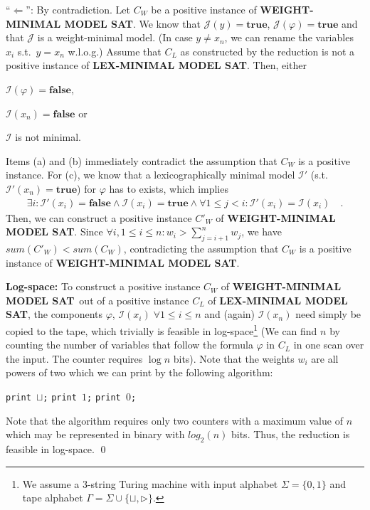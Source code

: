 \documentclass [11pt]{article}
\renewcommand{\phi}{\varphi}
\newcommand{\blank}{\sqcup}
\newcommand{\ssym}{\triangleright}
\newcommand{\True}{\mathbf{true}}
\newcommand{\False}{\mathbf{false}}
\newcommand{\MINWEIGHTSAT}{\textbf{WEIGHT-MINIMAL MODEL SAT}}
\newcommand{\MINLEXSAT}{\textbf{LEX-MINIMAL MODEL SAT}}
\newcommand{\mI}{\ensuremath{\mathcal{I}}}
\newcommand{\mJ}{\ensuremath{\mathcal{J}}}
\newcommand{\mIp}{\ensuremath{\mathcal{I}'}}
\newcommand{\fai}{\ensuremath{\forall i, 1 \leq i \leq n}}
\begin{document}
``$\Leftarrow$'': 
By contradiction.
Let $C_W$ be a positive instance of \MINWEIGHTSAT. We know that $\mJ(y) = \True$, $\mJ(\phi) = \True$ and that $\mJ$ is a weight-minimal model.
(In case $y \neq x_n$, we can rename the variables $x_i$ s.t.\ $y=x_n$ w.l.o.g.)
Assume that $C_L$ as constructed by the reduction is not a positive instance of \MINLEXSAT.
Then, either 
\begin{inparaenum}
\item $\mI(\phi) = \False $,
\item $\mI(x_n) = \False$ or
\item $\mI$ is not minimal.
\end{inparaenum}
Items (a) and (b) immediately contradict the assumption that $C_W$ is a positive instance.
For (c), we know that a lexicographically minimal model $\mIp$ (s.t.\ $\mIp(x_n) = \True$) for $\phi$ has to exists, which implies
\begin{align*}
 \exists i: \mIp(x_i) = \False \land  \mI(x_i) = \True \land \forall 1 \leq j < i: \mIp(x_i) = \mI(x_i) \quad .
\end{align*}
Then, we can construct a positive instance $C'_W$ of \MINWEIGHTSAT.
Since $\fai: w_i > \sum_{j=i+1}^{n} w_j $, we have $sum(C'_W) < sum(C_W)$, contradicting the assumption that $C_W$ is a positive instance of \MINWEIGHTSAT.

\medskip
\noindent
\textbf{Log-space:} To construct a positive instance $C_W$ of \MINWEIGHTSAT\ out of a positive instance $C_L$ of \MINLEXSAT, the components $\phi$, $\mI(x_i) \;\forall 1 \leq i \leq n$ and (again) $\mI(x_n)$  need simply be copied to the tape, which trivially is feasible in log-space\footnote{We assume a 3-string Turing machine with input alphabet $\Sigma = \{0,1\}$ and tape alphabet $\Gamma = \Sigma \cup\{\blank, \ssym\}$.} (We can find $n$ by counting the number of variables that follow the formula $\phi$ in $C_L$ in one scan over the input. The counter requires $\log n$ bits).
Note that the weights $w_i$ are all powers of two which we can print by the following algorithm:
\begin{algorithmic}
      \State \texttt{print $\blank$;}
      \State \texttt{print $1$;}
	\State \texttt{print $0$;}
      \EndFor
\EndFor
\end{algorithmic}
Note that the algorithm requires only two counters with a maximum value of $n$ which may be represented in binary with $log_2(n)$ bits. 
Thus, the reduction is feasible in log-space.
\qed
\end{document}
